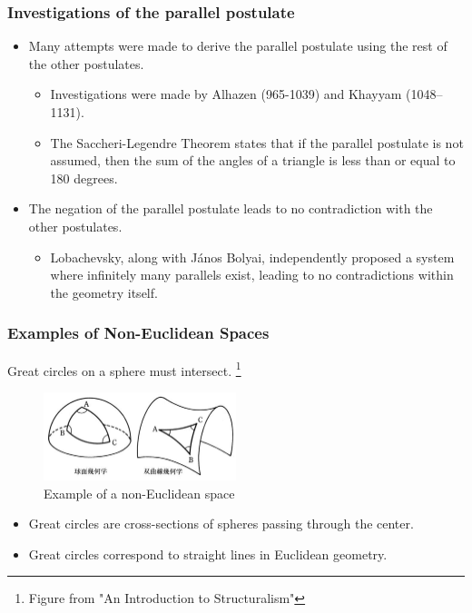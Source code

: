 \documentclass[unicode, 14pt, aspectratio=169]{beamer}
\newcommand\blfootnote[1]{%
  \begingroup
  \renewcommand\thefootnote{}\footnote{#1}%
  \addtocounter{footnote}{-1}%
  \endgroup
}
\begin{document}
\begin{frame}
  \frametitle{Investigations of the parallel postulate}
  \begin{itemize}
  \item Many attempts were made to derive the parallel postulate using the rest of the other postulates.
    \begin{itemize}
    \item Investigations were made by Alhazen (965-1039) and Khayyam (1048–1131).
    \item The Saccheri-Legendre Theorem states that if the parallel postulate is not assumed, then the sum of the angles of a triangle is less than or equal to 180 degrees.
    \end{itemize}
  \item The negation of the parallel postulate leads to no contradiction with the other postulates.
    \begin{itemize}
      \item Lobachevsky, along with János Bolyai, independently proposed a system where infinitely many parallels exist, leading to no contradictions within the geometry itself.
    \end{itemize}
  \end{itemize}
\end{frame}
\begin{frame}
  \frametitle{Examples of Non-Euclidean Spaces}
  {\large Great circles on a sphere must intersect.}
  \blfootnote{Figure from "An Introduction to Structuralism"\supercite{structure}}
  \begin{figure}
    \includegraphics[width=0.5\textwidth]{images/non-euclid.png}
    \caption{Example of a non-Euclidean space}
  \end{figure}
  \begin{itemize}
  \item Great circles are cross-sections of spheres passing through the center.
  \item Great circles correspond to straight lines in Euclidean geometry.
  \end{itemize}
\end{frame}
\end{document}
